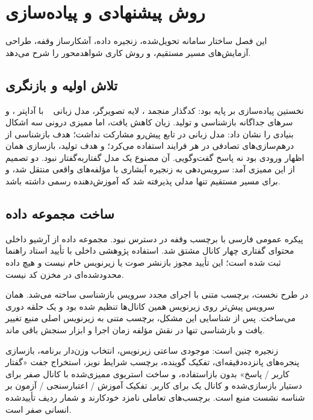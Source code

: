 \chapter{روش پیشنهادی و پیاده‌سازی}
\label{ch:method}

این فصل ساختار سامانه تحویل‌شده، زنجیره داده، آشکارساز وقفه، طراحی
آزمایش‌های مسیر مستقیم، و روش کاری شواهد‌محور را شرح می‌دهد.

\section{تلاش اولیه و بازنگری}
\label{sec:early-attempt}

نخستین پیاده‌سازی بر پایه  بود: کدگذار منجمد
، لایه تصویرگر، مدل زبانی ~\cite{qwen2025qwen25}
با آداپتر ، و سرهای جداگانه بازشناسی و تولید. زیان کاهش یافت، اما
ممیزی درونی سه اشکال بنیادی را نشان داد: مدل زبانی در تابع پیش‌رو مشارکت
نداشت؛ هدف بازشناسی از درهم‌سازی‌های تصادفی در هر فرایند استفاده می‌کرد؛ و
هدف تولید، بازسازی همان اظهار ورودی بود نه پاسخ گفت‌وگویی. آن مصنوع یک مدل
گفتار‌به‌گفتار نبود. دو تصمیم از این ممیزی آمد: سرویس‌دهی به زنجیره آبشاری
با مؤلفه‌های واقعی منتقل شد، و برای مسیر مستقیم تنها مدلی پذیرفته شد که
آموزش‌دهنده رسمی داشته باشد.

\section{ساخت مجموعه داده}
\label{sec:data}

پیکره عمومی فارسی با برچسب وقفه در دسترس نبود. مجموعه داده از آرشیو داخلی
محتوای گفتاری چهار کانال مشتق شد. استفاده پژوهشی داخلی با تأیید استاد
راهنما ثبت شده است؛ این تأیید مجوز بازنشر صوت یا زیرنویس خام نیست و هیچ
داده محدودشده‌ای در مخزن کد نیست.

در طرح نخست، برچسب متنی با اجرای مجدد سرویس بازشناسی ساخته می‌شد. همان
سرویس پیش‌تر روی زیرنویس همین کانال‌ها تنظیم شده بود و یک حلقه دوری
می‌ساخت. پس از شناسایی این مشکل، برچسب متنی به زیرنویس اصلی منبع تغییر یافت
و بازشناسی تنها در نقش مؤلفه زمان اجرا و ابزار سنجش باقی ماند.

زنجیره چنین است: موجودی  ساعتی زیرنویس، انتخاب وزن‌دار برنامه،
بازسازی پنجره‌های پانزده‌دقیقه‌ای، تفکیک گوینده، برچسب شرایط نویز، استخراج
جفت «گفتار کاربر / پاسخ» بدون بازاستفاده، و ساخت استریوی ممیزی‌شده با کانال
صفر برای دستیار بازسازی‌شده و کانال یک برای کاربر. تفکیک
آموزش / اعتبارسنجی / آزمون بر شناسه نشست منبع است. برچسب‌های تعاملی
نامزد خودکارند و شمار ردیف تأییدشده انسانی صفر است.

